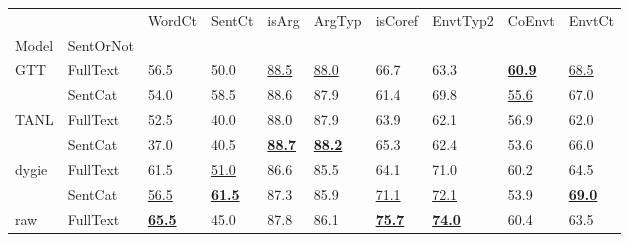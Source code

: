 \begin{tabular}{llllllllll}
\toprule
    &          &                     WordCt &                     SentCt &                      isArg &                     ArgTyp &                    isCoref &                   EnvtTyp2 &                     CoEnvt &                     EnvtCt \\
Model & SentOrNot &                            &                            &                            &                            &                            &                            &                            &                            \\
\midrule
GTT & FullText &                       56.5 &                       50.0 &           \underline{88.5} &           \underline{88.0} &                       66.7 &                       63.3 &  \underline{\textbf{60.9}} &           \underline{68.5} \\
    & SentCat &                       54.0 &                       58.5 &                       88.6 &                       87.9 &                       61.4 &                       69.8 &           \underline{55.6} &                       67.0 \\
TANL & FullText &                       52.5 &                       40.0 &                       88.0 &                       87.9 &                       63.9 &                       62.1 &                       56.9 &                       62.0 \\
    & SentCat &                       37.0 &                       40.5 &  \underline{\textbf{88.7}} &  \underline{\textbf{88.2}} &                       65.3 &                       62.4 &                       53.6 &                       66.0 \\
dygie & FullText &                       61.5 &           \underline{51.0} &                       86.6 &                       85.5 &                       64.1 &                       71.0 &                       60.2 &                       64.5 \\
    & SentCat &           \underline{56.5} &  \underline{\textbf{61.5}} &                       87.3 &                       85.9 &           \underline{71.1} &           \underline{72.1} &                       53.9 &  \underline{\textbf{69.0}} \\
raw & FullText &  \underline{\textbf{65.5}} &                       45.0 &                       87.8 &                       86.1 &  \underline{\textbf{75.7}} &  \underline{\textbf{74.0}} &                       60.4 &                       63.5 \\
\bottomrule
\end{tabular}
